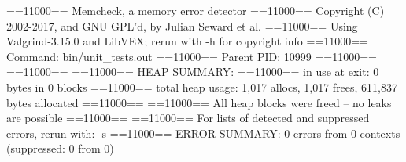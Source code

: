 ==11000== Memcheck, a memory error detector
==11000== Copyright (C) 2002-2017, and GNU GPL'd, by Julian Seward et al.
==11000== Using Valgrind-3.15.0 and LibVEX; rerun with -h for copyright info
==11000== Command: bin/unit_tests.out
==11000== Parent PID: 10999
==11000== 
==11000== 
==11000== HEAP SUMMARY:
==11000==     in use at exit: 0 bytes in 0 blocks
==11000==   total heap usage: 1,017 allocs, 1,017 frees, 611,837 bytes allocated
==11000== 
==11000== All heap blocks were freed -- no leaks are possible
==11000== 
==11000== For lists of detected and suppressed errors, rerun with: -s
==11000== ERROR SUMMARY: 0 errors from 0 contexts (suppressed: 0 from 0)
